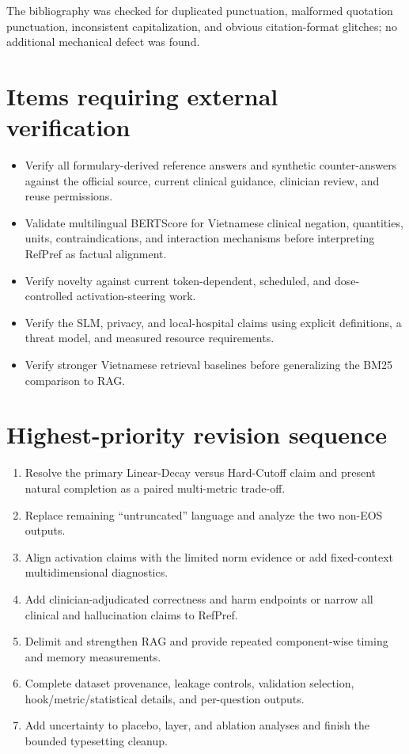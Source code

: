 \documentclass[11pt]{article}
\begin{document}
The bibliography was checked for duplicated punctuation, malformed quotation punctuation, inconsistent capitalization, and obvious citation-format glitches; no additional mechanical defect was found.

\section*{Items requiring external verification}

\begin{itemize}
    \item Verify all formulary-derived reference answers and synthetic counter-answers against the official source, current clinical guidance, clinician review, and reuse permissions.
    \item Validate multilingual BERTScore for Vietnamese clinical negation, quantities, units, contraindications, and interaction mechanisms before interpreting RefPref as factual alignment.
    \item Verify novelty against current token-dependent, scheduled, and dose-controlled activation-steering work.
    \item Verify the SLM, privacy, and local-hospital claims using explicit definitions, a threat model, and measured resource requirements.
    \item Verify stronger Vietnamese retrieval baselines before generalizing the BM25 comparison to RAG.
\end{itemize}

\section*{Highest-priority revision sequence}

\begin{enumerate}
    \item Resolve the primary Linear-Decay versus Hard-Cutoff claim and present natural completion as a paired multi-metric trade-off.
    \item Replace remaining ``untruncated'' language and analyze the two non-EOS outputs.
    \item Align activation claims with the limited norm evidence or add fixed-context multidimensional diagnostics.
    \item Add clinician-adjudicated correctness and harm endpoints or narrow all clinical and hallucination claims to RefPref.
    \item Delimit and strengthen RAG and provide repeated component-wise timing and memory measurements.
    \item Complete dataset provenance, leakage controls, validation selection, hook/metric/statistical details, and per-question outputs.
    \item Add uncertainty to placebo, layer, and ablation analyses and finish the bounded typesetting cleanup.
\end{enumerate}
\end{document}
